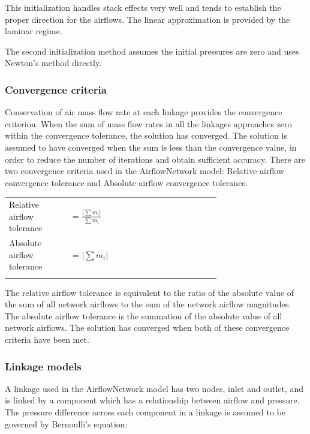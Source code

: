 This initialization handles stack effects very well and tends to establish the proper direction for the airflows. The linear approximation is provided by the laminar regime.

The second initialization method assumes the initial pressures are zero and uses Newton's method directly.

\subsubsection{Convergence criteria}\label{convergence-criteria}

Conservation of air mass flow rate at each linkage provides the convergence criterion. When the sum of mass flow rates in all the linkages approaches zero within the convergence tolerance, the solution has converged. The solution is assumed to have converged when the sum is less than the convergence value, in order to reduce the number of iterations and obtain sufficient accuracy. There are two convergence criteria used in the AirflowNetwork model: Relative airflow convergence tolerance and Absolute airflow convergence tolerance.

\begin{tabular}{lp{0.7\linewidth}}
\\
Relative airflow tolerance &= $\frac{\left| \sum \dot{m}_i \right|}{\sum \dot{m}_i}$ \\
Absolute airflow tolerance &= $\left| \sum \dot{m}_i \right|$ \\
\\
\end{tabular}

The relative airflow tolerance is equivalent to the ratio of the absolute value of the sum of all network airflows to the sum of the network airflow magnitudes.~ The absolute airflow tolerance is the summation of the absolute value of all network airflows. The solution has converged when both of these convergence criteria have been met.

\subsubsection{Linkage models}\label{linkage-models}

A linkage used in the AirflowNetwork model has two nodes, inlet and outlet, and is linked by a component which has a relationship between airflow and pressure.~ The pressure difference across each component in a linkage is assumed to be governed by Bernoulli's equation:

